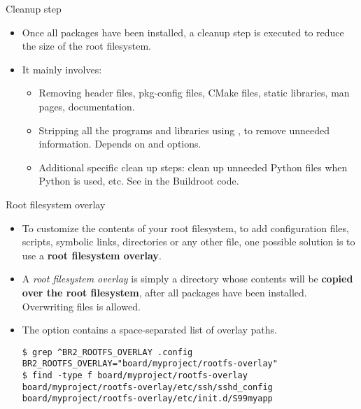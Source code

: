 \begin{frame}{Cleanup step}
  \begin{itemize}
  \item Once all packages have been installed, a cleanup step is
    executed to reduce the size of the root filesystem.
  \item It mainly involves:
    \begin{itemize}
    \item Removing header files, pkg-config files, CMake files, static
      libraries, man pages, documentation.
    \item Stripping all the programs and libraries using ,
      to remove unneeded information. Depends on
       and  options.
    \item Additional specific clean up steps: clean up unneeded Python
      files when Python is used, etc. See 
      in the Buildroot code.
    \end{itemize}
  \end{itemize}
\end{frame}

\begin{frame}[fragile]{Root filesystem overlay}

  \begin{itemize}

  \item To customize the contents of your root filesystem, to add
    configuration files, scripts, symbolic links, directories or any
    other file, one possible solution is to use a {\bf root filesystem
      overlay}.

  \item A {\em root filesystem overlay} is simply a directory whose
    contents will be {\bf copied over the root filesystem}, after all
    packages have been installed. Overwriting files is allowed.

  \item The option  contains a
    space-separated list of overlay paths.

\begin{block}{}
{\small
\begin{verbatim}
$ grep ^BR2_ROOTFS_OVERLAY .config
BR2_ROOTFS_OVERLAY="board/myproject/rootfs-overlay"
$ find -type f board/myproject/rootfs-overlay
board/myproject/rootfs-overlay/etc/ssh/sshd_config
board/myproject/rootfs-overlay/etc/init.d/S99myapp
\end{verbatim}}
\end{block}

  \end{itemize}

\end{frame}

